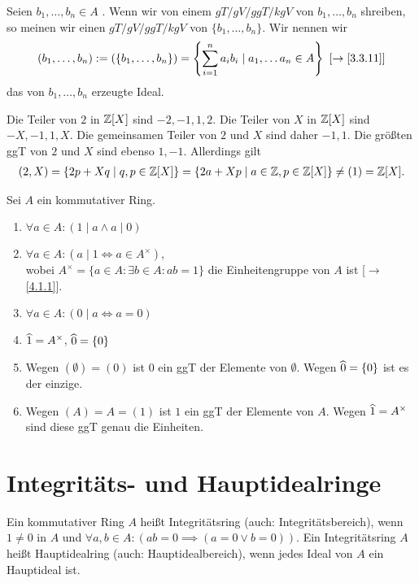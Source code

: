 \documentclass[../../main.tex]{subfiles}
\begin{document}
\begin{spr}\label{16.1.10}
Seien $b_1,\ldots ,b_n\in A$ . Wenn wir von einem $gT/ gV/ ggT/ kgV$ von $b_1,\ldots ,b_n$ shreiben, so meinen wir einen $gT/ gV/ ggT/ kgV$ von $\{b_1,\ldots ,b_n\}$. Wir nennen wir 
\begin{align*}
(b_1,\ldots,b_n):=(\{b_1,\ldots ,b_n\})=\left\{\sum_{i=1}^n a_ib_i\mid a_1,\ldots a_n\in A\right\}\ [\to\ref{3.3.11}]
\end{align*}
das von $b_1,\ldots ,b_n$ erzeugte Ideal.
\end{spr}

\begin{bsp}\label{16.1.11}
Die Teiler von $2$ in $\mathbb Z[X]$ sind $-2,-1,1,2$. Die Teiler von $X$ in $\mathbb Z[X]$ sind $-X,-1,1,X$. Die gemeinsamen Teiler von $2$ und $X$ sind daher $-1,1$. Die größten ggT von $2$ und $X$ sind ebenso $1,-1$. Allerdings gilt
\begin{align*}
(2,X)=\{2p+Xq\mid q,p\in \mathbb Z[X]\}=\{2a+Xp\mid a\in \mathbb Z, p\in \mathbb Z[X]\}\neq (1)=\mathbb Z[X].
\end{align*}
\end{bsp}

\begin{bsp}\label{16.1.12}
Sei $A$ ein kommutativer Ring.
\begin{enumerate}[\normalfont(a)]
\item $\forall a\in A: (1\mid a\land a\mid 0)$
\item $\forall a\in A: (a\mid 1\Longleftrightarrow a\in A^\times)$,\\
wobei $A^\times=\{a\in A: \exists b\in A: ab=1\}$ die Einheitengruppe von $A$ ist [$\to$\ref{4.1.1}].
\item $\forall a\in A: (0\mid a\Longleftrightarrow a=0)$
\item $\widehat{1}=A^\times$, $\widehat{0}=\{0\}$
\item Wegen $(\emptyset)=(0)$ ist $0$ ein ggT der Elemente von $\emptyset$. Wegen $\widehat{0}=\{0\}$ ist es der einzige.
\item Wegen $(A)=A=(1)$ ist $1$ ein ggT der Elemente von $A$. Wegen $\widehat{1}=A^\times$ sind diese ggT genau die Einheiten.
\end{enumerate}
\end{bsp}

\section{Integritäts- und Hauptidealringe}

\begin{df}\label{16.2.1}
Ein kommutativer Ring $A$ heißt Integritätsring (auch: Integritätsbereich), wenn $1\neq 0$ in $A$ und $\forall a,b\in A: (ab=0\implies (a=0\lor b=0))$. Ein Integritätsring $A$ heißt Hauptidealring (auch: Hauptidealbereich), wenn jedes Ideal von $A$ ein Hauptideal ist.
\end{df}
\end{document}
